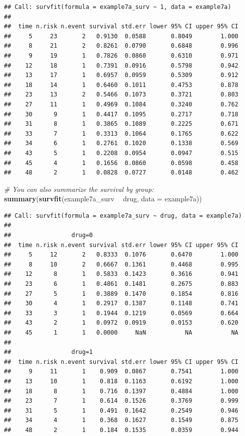 \documentclass[]{book}
\newenvironment{Shaded}{\begin{snugshade}}{\end{snugshade}}
\newcommand{\CommentTok}[1]{\textcolor[rgb]{0.56,0.35,0.01}{\textit{#1}}}
\newcommand{\DataTypeTok}[1]{\textcolor[rgb]{0.13,0.29,0.53}{#1}}
\newcommand{\KeywordTok}[1]{\textcolor[rgb]{0.13,0.29,0.53}{\textbf{#1}}}
\newcommand{\NormalTok}[1]{#1}
\newcommand{\OperatorTok}[1]{\textcolor[rgb]{0.81,0.36,0.00}{\textbf{#1}}}
\newcommand{\StringTok}[1]{\textcolor[rgb]{0.31,0.60,0.02}{#1}}
\begin{document}
\begin{verbatim}
## Call: survfit(formula = example7a_surv ~ 1, data = example7a)
## 
##  time n.risk n.event survival std.err lower 95% CI upper 95% CI
##     5     23       2   0.9130  0.0588       0.8049        1.000
##     8     21       2   0.8261  0.0790       0.6848        0.996
##     9     19       1   0.7826  0.0860       0.6310        0.971
##    12     18       1   0.7391  0.0916       0.5798        0.942
##    13     17       1   0.6957  0.0959       0.5309        0.912
##    18     14       1   0.6460  0.1011       0.4753        0.878
##    23     13       2   0.5466  0.1073       0.3721        0.803
##    27     11       1   0.4969  0.1084       0.3240        0.762
##    30      9       1   0.4417  0.1095       0.2717        0.718
##    31      8       1   0.3865  0.1089       0.2225        0.671
##    33      7       1   0.3313  0.1064       0.1765        0.622
##    34      6       1   0.2761  0.1020       0.1338        0.569
##    43      5       1   0.2208  0.0954       0.0947        0.515
##    45      4       1   0.1656  0.0860       0.0598        0.458
##    48      2       1   0.0828  0.0727       0.0148        0.462
\end{verbatim}

\begin{Shaded}
\begin{Highlighting}[]
\CommentTok{# You can also summarize the survival by group:}
\KeywordTok{summary}\NormalTok{(}\KeywordTok{survfit}\NormalTok{(example7a_surv }\OperatorTok{~}\StringTok{ }\NormalTok{drug, }\DataTypeTok{data =}\NormalTok{ example7a))}
\end{Highlighting}
\end{Shaded}

\begin{verbatim}
## Call: survfit(formula = example7a_surv ~ drug, data = example7a)
## 
##                 drug=0 
##  time n.risk n.event survival std.err lower 95% CI upper 95% CI
##     5     12       2   0.8333  0.1076       0.6470        1.000
##     8     10       2   0.6667  0.1361       0.4468        0.995
##    12      8       1   0.5833  0.1423       0.3616        0.941
##    23      6       1   0.4861  0.1481       0.2675        0.883
##    27      5       1   0.3889  0.1470       0.1854        0.816
##    30      4       1   0.2917  0.1387       0.1148        0.741
##    33      3       1   0.1944  0.1219       0.0569        0.664
##    43      2       1   0.0972  0.0919       0.0153        0.620
##    45      1       1   0.0000     NaN           NA           NA
## 
##                 drug=1 
##  time n.risk n.event survival std.err lower 95% CI upper 95% CI
##     9     11       1    0.909  0.0867       0.7541        1.000
##    13     10       1    0.818  0.1163       0.6192        1.000
##    18      8       1    0.716  0.1397       0.4884        1.000
##    23      7       1    0.614  0.1526       0.3769        0.999
##    31      5       1    0.491  0.1642       0.2549        0.946
##    34      4       1    0.368  0.1627       0.1549        0.875
##    48      2       1    0.184  0.1535       0.0359        0.944
\end{verbatim}
\end{document}
